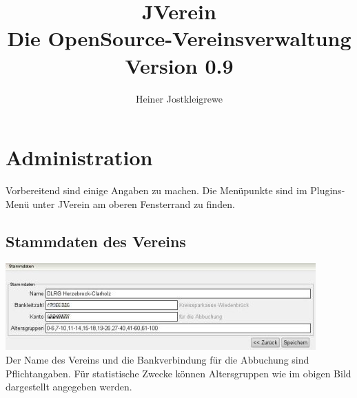 \documentclass[a4paper,BCOR30mm,DIV14,pdftex,liststotoc,footsepline,openany]{scrbook}
\author{Heiner Jostkleigrewe}
\title{JVerein \\ Die OpenSource-Vereinsverwaltung\\Version 0.9}
\begin{document}
\maketitle
\tableofcontents

\chapter{Administration}
Vorbereitend sind einige Angaben zu machen. Die Menüpunkte sind im Plugins-Menü unter JVerein am oberen Fensterrand zu finden.

\section{Stammdaten des Vereins}
\includegraphics{./screenshots/stammdaten.jpg}\\
Der Name des Vereins und die Bankverbindung für die Abbuchung sind Pflichtangaben. Für statistische Zwecke können
Altersgruppen wie im obigen Bild dargestellt angegeben werden.
\end{document}
